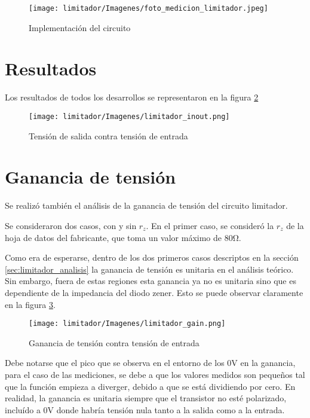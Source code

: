 \begin{figure}[H]
    \begin{center}
        \texttt{[image: limitador/Imagenes/foto\_medicion\_limitador.jpeg]}
        \caption{Implementación del circuito}
        \label{implementacion_limitador}
    \end{center}
\end{figure}

\section{Resultados}
Los resultados de todos los desarrollos se representaron en la figura \ref{fig:lim_inout}

\begin{figure}[H]
    \begin{center}
        \texttt{[image: limitador/Imagenes/limitador\_inout.png]}
        \caption{Tensión de salida contra tensión de entrada}
        \label{fig:lim_inout}
    \end{center}
\end{figure}

\section{Ganancia de tensión}
Se realizó también el análisis de la ganancia de tensión del circuito limitador. 

Se consideraron dos casos, con y sin $r_z$. En el primer caso, se consideró la $r_z$ de la hoja de datos del fabricante, que toma un valor máximo de $80 \si{\ohm}$.

Como era de esperarse, 
dentro de los dos primeros casos descriptos en la sección 
\ref{sec:limitador_analisis} la ganancia de tensión es unitaria
 en el análisis teórico. Sin embargo, fuera de estas regiones
  esta ganancia ya no es unitaria sino que es dependiente de
   la impedancia del diodo zener. Esto se puede observar 
   claramente en la
    figura \ref{fig:lim_gain}.

\begin{figure}[H]
    \begin{center}
        \texttt{[image: limitador/Imagenes/limitador\_gain.png]}
        \caption{Ganancia de tensión contra tensión de entrada}
        \label{fig:lim_gain}
    \end{center}
\end{figure}

Debe notarse que el pico que se observa en el entorno
 de los $0 \si{\volt}$ en la ganancia, 
para el caso de las mediciones, se debe a que los valores medidos 
  son pequeños tal que la función empieza a diverger, debido a que se está dividiendo por 
  cero. En realidad, la ganancia es unitaria siempre que el transistor no esté polarizado, 
  incluído a $0 \si{\volt}$ donde habría tensión nula tanto a la salida como a la entrada.

